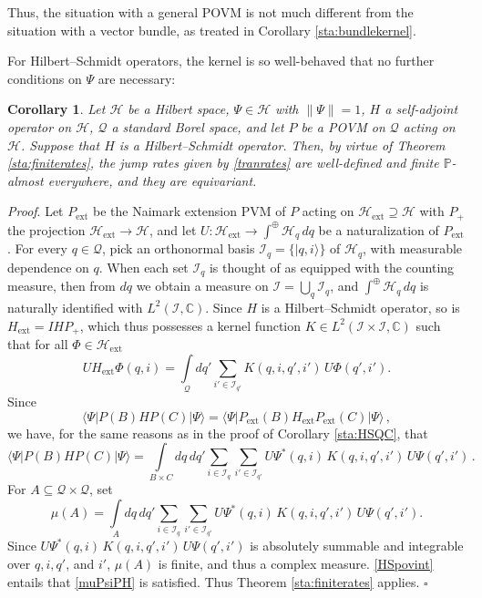 \documentclass[12pt]{article}
\newcommand{\CCC}{\mathbb{C}} %
\newcommand{\1}{\mathbf{1}} %
\newcommand{\Hilbert}{\mathscr{H}}
\renewcommand{\sp}[2]{\langle #1 | #2 \rangle} %
\newcommand{\conf}{\mathcal{Q}} %
\newcommand{\measure}{\mathbb{P}} %
\newcommand{\pov}{{P}}%
\newcommand{\basis}{\mathscr{I}}
\newcommand{\ext}{{\mathrm{ext}}} %
\newtheorem{corollary}{Corollary}
\newenvironment{proof}{\noindent 
\textit{Proof}.}{\hfill$\square$\bigskip}
\begin{document}
Thus, the situation with a general POVM is not much different from the
situation with a vector bundle, as treated in Corollary
\ref{sta:bundlekernel}.

For Hilbert--Schmidt operators, the kernel is so well-behaved that no
further conditions on $\Psi$ are necessary:

\begin{corollary}\label{sta:HSPOVM}
   Let $\Hilbert$ be a Hilbert space, $\Psi \in \Hilbert$ with
   $\|\Psi\| =1$, $H$ a self-adjoint operator on $\Hilbert$, $\conf$ a
   standard Borel space, and let $\pov$ be a POVM on $\conf$ acting on
   $\Hilbert$. Suppose that $H$ is a Hilbert--Schmidt operator. Then,
   by virtue of Theorem \ref{sta:finiterates}, the jump rates given by
   \eqref{tranrates} are well-defined and finite $\measure$-almost
   everywhere, and they are  equivariant.
\end{corollary}

\begin{proof}
Let $\pov_\ext$ be the Naimark extension PVM of $\pov$ acting on
$\Hilbert_\ext \supseteq \Hilbert$ with $P_+$ the projection
$\Hilbert_\ext \to \Hilbert$, and let $U: \Hilbert_\ext \to
\int^\oplus \Hilbert_q \, dq$ be a naturalization of $\pov_\ext$.  For
every $q\in \conf$, pick an orthonormal basis $\basis_q =
\{|q,i\rangle\}$ of $\Hilbert_q$, with measurable dependence on
$q$. When each set $\basis_q$ is thought of as equipped with the
counting measure, then from $dq$ we obtain a measure on $\basis =
\bigcup_q \basis_q$, and $\int^\oplus \Hilbert_q\, dq$ is naturally
identified with $L^2(\basis,\CCC)$.  Since $H$ is a Hilbert--Schmidt
operator, so is $H_\ext= IHP_+$, which thus possesses a kernel
function $K \in L^2(\basis\times\basis, \CCC)$ such that for all
$\Phi\in\Hilbert_\ext$
\[
   U H_\ext \Phi(q,i) = \int\limits_{\conf} dq' \sum_{i' \in \basis_{q'}}
K(q,i,
   q',i') \, U\Phi(q',i').
\]
Since
\[
\sp{\Psi}{\pov(B) H \pov(C) |\Psi} = \sp{\Psi}{\pov_\ext(B) H_\ext
\pov_\ext(C) |\Psi}\,,
\]
  we have, for the same reasons as in the proof of Corollary
\ref{sta:HSQC}, that
\begin{equation}\label{HSpovint}
   \sp{\Psi}{\pov(B) H \pov(C) |\Psi} = \int\limits_{B \times C} dq \,
   dq' \sum_{i\in \basis_q} \sum_{i' \in \basis_{q'}}  U\Psi^*(q,i) \,
   K(q,i,q',i') \, U\Psi(q',i') \,.
\end{equation}
For $A \subseteq \conf \times \conf$, set
\[
   \mu(A) = \int\limits_{A} dq\, dq' \sum_{i \in \basis_q} \sum_{i' \in
   \basis_{q'}} U\Psi^*(q,i) \, K(q,i,q',i') \, U\Psi(q',i').
\]
Since $U\Psi^*(q,i) \, K(q,i,q',i') \, U\Psi(q',i')$ is absolutely
summable and integrable over $q,i,q'$, and $i'$, $\mu(A)$ is finite,
and thus a complex measure. \eqref{HSpovint} entails that
\eqref{muPsiPH} is satisfied. Thus Theorem \ref{sta:finiterates}
applies.
\end{proof}
\end{document}
